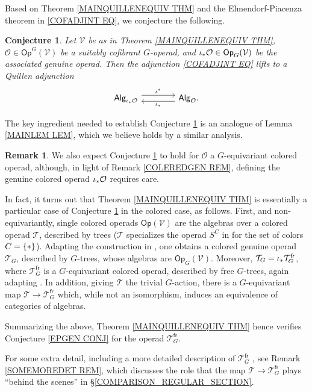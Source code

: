 \documentclass[a4paper,10pt
,draft
]{article}%
\numberwithin{equation}{section}
\numberwithin{figure}{section}
\newtheorem{conjecture}[equation]{Conjecture}%
\theoremstyle{definition} %
\newtheorem{remark}[equation]{Remark}%
\newcommand{\1}{\ensuremath{\mathbbm 1}}%
\begin{document}
Based on Theorem \ref{MAINQUILLENEQUIV THM}
and the Elmendorf-Piacenza theorem in \eqref{COFADJINT EQ},
we conjecture the following.

\begin{conjecture}\label{EPGEN CONJ}
	Let $\mathcal{V}$ be as in 
	Theorem \ref{MAINQUILLENEQUIV THM},
	$\mathcal{O} \in \mathsf{Op}^G(\mathcal{V})$
	be a suitably cofibrant $G$-operad,
	and $\iota_{\**}\mathcal{O} \in \mathsf{Op}_G(\mathcal{V})$
	be the associated genuine operad. Then the adjunction 
	\eqref{COFADJINT EQ} lifts to a Quillen adjunction
\[
\begin{tikzcd}[column sep =4em]
	\mathsf{Alg}_{\iota_{\**} \mathcal{O}}
	\ar[shift left=1.5]{r}{\iota^{\**}} 
&
	\mathsf{Alg}_{\mathcal{O}}
	\ar[shift left=1.5]{l}{\iota_{\**}}.
\end{tikzcd}
\]
\end{conjecture}

The key ingredient needed to establish Conjecture \ref{EPGEN CONJ}
is an analogue of Lemma \ref{MAINLEM LEM}, which we believe holds by a similar analysis.


\begin{remark}\label{ALGELMCOL REM}
	We also expect Conjecture \ref{EPGEN CONJ}
	to hold for $\mathcal{O}$
	a $G$-equivariant colored operad,
	although, in light of Remark \ref{COLEREDGEN REM},
	defining the genuine colored operad $\iota_{\**} \mathcal{O}$
	requires care.
	
	In fact, it turns out that 
	Theorem \ref{MAINQUILLENEQUIV THM} 
	is essentially a particular case of Conjecture \ref{EPGEN CONJ}
	in the colored case, as follows.
	First, and non-equivariantly, single colored operads
	$\mathsf{Op}(\mathcal{V})$
	are the algebras over a colored operad $\mathcal{T}$,
	described by trees
	($\mathcal{T}$ specializes the operad $S^C$ in \cite[\S 3.2]{GV12}
	for the set of colors $C= \{\**\}$).
	Adapting the construction in \cite[\S 3.2]{GV12},
	one obtains a colored genuine operad 
	$\mathcal{T}_G$, described by $G$-trees, 
	whose algebras are $\mathsf{Op}_G(\mathcal{V})$.
	Moreover,
	$\mathcal{T}_G = \iota_{\**} \mathcal{T}^{\mathsf{fr}}_G$,
	where $\mathcal{T}^{\mathsf{fr}}_G$ is
	a $G$-equivariant colored operad, 
	described by free $G$-trees, 
	again adapting \cite{GV12}.
	In addition, 
	giving $\mathcal{T}$ the trivial $G$-action,
	there is a $G$-equivariant map 
	$\mathcal{T} \to \mathcal{T}^{\mathsf{fr}}_G$ 
	which, while not an isomorphism, 
	induces an equivalence of categories of algebras.
	
	Summarizing the above, 
	Theorem \ref{MAINQUILLENEQUIV THM} 
	hence verifies Conjecture \eqref{EPGEN CONJ}
	for the operad $\mathcal{T}^{\mathsf{fr}}_G$. 
	
	For some extra detail, 
	including a more detailed description of $\mathcal{T}^{\mathsf{fr}}_G$ ,
	see Remark \ref{SOMEMOREDET REM},
	which discusses the role that the map
	$\mathcal{T} \to \mathcal{T}^{\mathsf{fr}}_G$ 
	plays ``behind the scenes''  in \S \ref{COMPARISON_REGULAR_SECTION}.
\end{remark}
\end{document}
